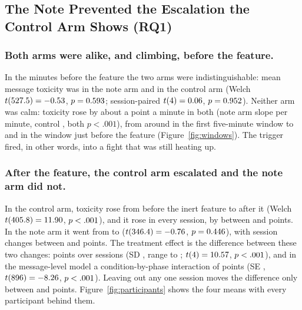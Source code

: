 \documentclass[manuscript,screen,review,anonymous]{acmart}
\begin{document}
\subsection{The Note Prevented the Escalation the Control Arm Shows (RQ1)}

\subsubsection{Both arms were alike, and climbing, before the feature.}
In the \StatnoteOnsetMin{} minutes before the feature the two arms were
indistinguishable: mean message toxicity was \StatexptPreM{} in the note arm
and \StatctrlPreM{} in the control arm (Welch
$t(527.5)=-0.53$, $p=0.593$; session-paired
$t(4)=0.06$, $p=0.952$). Neither arm was calm:
toxicity rose by about a point a minute in both (note arm slope
\StatexptPreSlope{} per minute, control \StatctrlPreSlope, both
$p<.001$), from around \StatexptWinFirst{} in the first five-minute window
to \StatexptWinPreMax{} and \StatctrlWinPreMax{} in the window just before
the feature (Figure~\ref{fig:windows}). The trigger fired, in other words,
into a fight that was still heating up.

\subsubsection{After the feature, the control arm escalated and the note arm did not.}
In the control arm, toxicity rose from \StatctrlPreM{} before the inert
feature to \StatctrlPostM{} after it (Welch
$t(405.8)=11.90$, $p<.001$), and it
rose in every session, by between \StatctrlChangeMin{} and
\StatctrlChangeMax{} points. In the note arm it went from \StatexptPreM{} to
\StatexptPostM{} ($t(346.4)=-0.76$,
$p=0.446$), with session changes between \StatexptChangeMin{}
and \StatexptChangeMax{} points. The treatment effect is the difference
between these two changes: \StatdidM{} points over sessions (SD
\StatdidSD, range \StatdidMin{} to \StatdidMax;
$t(4)=10.57$, $p<.001$), and in the message-level model
a condition-by-phase interaction of \StatolsIntB{} points (SE
\StatolsIntSE, $t(896)=-8.26$, $p<.001$). Leaving
out any one session moves the difference only between \StatlooMin{} and
\StatlooMax{} points. Figure~\ref{fig:participants} shows the four means
with every participant behind them.
\end{document}
